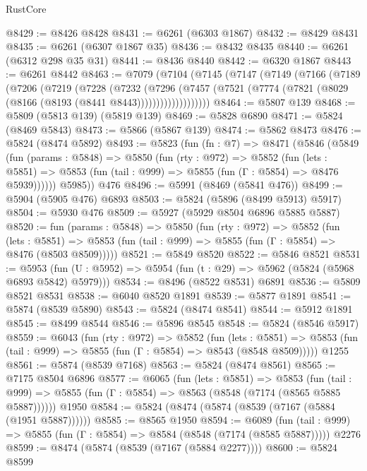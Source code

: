 \begin{lexlean}{RustCore}
\begin{coremodule}
@8429 := @8426 @8428
@8431 := @6261 (@6303 @1867)
@8432 := @8429 @8431
@8435 := @6261 (@6307 @1867 @35)
@8436 := @8432 @8435
@8440 := @6261 (@6312 @298 @35 @31)
@8441 := @8436 @8440
@8442 := @6320 @1867
@8443 := @6261 @8442
@8463 := @7079
    (@7104
      (@7145
        (@7147
          (@7149
            (@7166
              (@7189
                (@7206
                  (@7219
                    (@7228
                      (@7232
                        (@7296
                          (@7457
                            (@7521
                              (@7774 (@7821 (@8029 (@8166 (@8193 (@8441 @8443)))))))))))))))))))
@8464 := @5807 @139
@8468 := @5809 (@5813 @139) (@5819 @139)
@8469 := @5828 @6890
@8471 := @5824 (@8469 @5843)
@8473 := @5866 (@5867 @139)
@8474 := @5862 @8473
@8476 := @5824 (@8474 @5892)
@8493 := @5823
    (fun (fn : @7) =>
    @8471
      (@5846
        (@5849
          (fun (params : @5848) =>
          @5850
            (fun (rty : @972) =>
            @5852
              (fun (lets : @5851) =>
              @5853 (fun (tail : @999) => @5855 (fun (Γ : @5854) => @8476 @5939))))))
        @5985))
    @476
@8496 := @5991 (@8469 (@5841 @476))
@8499 := @5904 (@5905 @476) @6893
@8503 := @5824 (@5896 (@8499 @5913) @5917)
@8504 := @5930 @476
@8509 := @5927 (@5929 @8504 @6896 @5885 @5887)
@8520 := fun (params : @5848) =>
  @5850
    (fun (rty : @972) =>
    @5852
      (fun (lets : @5851) =>
      @5853 (fun (tail : @999) => @5855 (fun (Γ : @5854) => @8476 (@8503 @8509)))))
@8521 := @5849 @8520
@8522 := @5846 @8521
@8531 := @5953 (fun (U : @5952) => @5954 (fun (t : @29) => @5962 (@5824 (@5968 @6893 @5842) @5979)))
@8534 := @8496 (@8522 @8531) @6891
@8536 := @5809 @8521 @8531
@8538 := @6040 @8520 @1891
@8539 := @5877 @1891
@8541 := @5874 (@8539 @5890)
@8543 := @5824 (@8474 @8541)
@8544 := @5912 @1891
@8545 := @8499 @8544
@8546 := @5896 @8545
@8548 := @5824 (@8546 @5917)
@8559 := @6043
    (fun (rty : @972) =>
    @5852
      (fun (lets : @5851) =>
      @5853 (fun (tail : @999) => @5855 (fun (Γ : @5854) => @8543 (@8548 @8509)))))
    @1255
@8561 := @5874 (@8539 @7168)
@8563 := @5824 (@8474 @8561)
@8565 := @7175 @8504 @6896
@8577 := @6065
    (fun (lets : @5851) =>
    @5853
      (fun (tail : @999) => @5855 (fun (Γ : @5854) => @8563 (@8548 (@7174 (@8565 @5885 @5887))))))
    @1950
@8584 := @5824 (@8474 (@5874 (@8539 (@7167 (@5884 (@1951 @5887))))))
@8585 := @8565 @1950
@8594 := @6089
    (fun (tail : @999) => @5855 (fun (Γ : @5854) => @8584 (@8548 (@7174 (@8585 @5887)))))
    @2276
@8599 := @8474 (@5874 (@8539 (@7167 (@5884 @2277))))
@8600 := @5824 @8599

\end{coremodule}
\end{lexlean}
